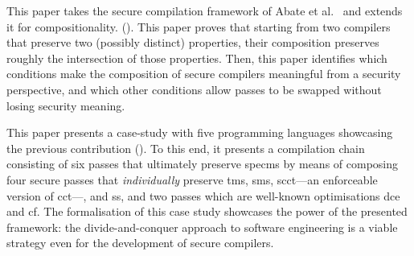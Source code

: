 \documentclass[dvipsnames,conference]{IEEEtran}
\theoremstyle{definition}
\begin{document}
\begin{asparaitem}[$\blacktriangleright$]
  \item %
        This paper takes the secure compilation framework of Abate et al.~\cite{abate2021extacc} and extends it for compositionality. ().
        This paper proves that starting from two compilers that preserve two (possibly distinct) properties, their composition preserves roughly the intersection of those properties.
        Then, this paper identifies which conditions make the composition of secure compilers meaningful from a security perspective, and which other conditions allow passes to be swapped without losing security meaning.

  \item %
        This paper presents a case-study with five programming languages showcasing the previous contribution ().
        To this end, it presents a compilation chain consisting of six passes that ultimately preserve \gls*{specms} by means of composing four secure passes that \emph{individually} preserve \gls*{tms}, \gls*{sms}, \gls*{scct}---an enforceable version of \gls*{cct}---, and \gls*{ss}, and two passes which are well-known optimisations \gls*{dce} and \gls*{cf}.
        The formalisation of this case study showcases the power of the presented framework: the divide-and-conquer approach to software engineering is a viable strategy even for the development of secure compilers.


\end{asparaitem}
\end{document}
